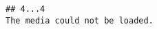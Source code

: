 \documentclass[
  11pt,
]{article}
\begin{document}
\begin{verbatim}
## 4...4                                                                                                                                                                                                                                                                                                                                                                                                                                                                                                                                                                                                                                                                                                                                                                                                                                                                                                                                                                                                                                                                                                                                                                                                                                                                                                                                                                                                                                                                                                                                                                                                                                                                                                                                                                                                                                                                                                                                                                                                The media could not be loaded.

\end{verbatim}
\end{document}
